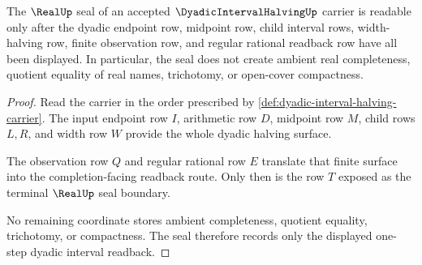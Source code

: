 \begin{theorem}
\label{thm:dyadic-interval-halving-real-seal-boundary}
The $\RealUp$ seal of an accepted $\DyadicIntervalHalvingUp$ carrier is readable only after the dyadic endpoint row, midpoint row, child interval rows, width-halving row, finite observation row, and regular rational readback row have all been displayed. In particular, the seal does not create ambient real completeness, quotient equality of real names, trichotomy, or open-cover compactness.
\end{theorem}
\begin{proof}
Read the carrier in the order prescribed by \autoref{def:dyadic-interval-halving-carrier}. The input endpoint row $I$, arithmetic row $D$, midpoint row $M$, child rows $L,R$, and width row $W$ provide the whole dyadic halving surface.

The observation row $Q$ and regular rational row $E$ translate that finite surface into the completion-facing readback route. Only then is the row $T$ exposed as the terminal $\RealUp$ seal boundary.

No remaining coordinate stores ambient completeness, quotient equality, trichotomy, or compactness. The seal therefore records only the displayed one-step dyadic interval readback.
\end{proof}

